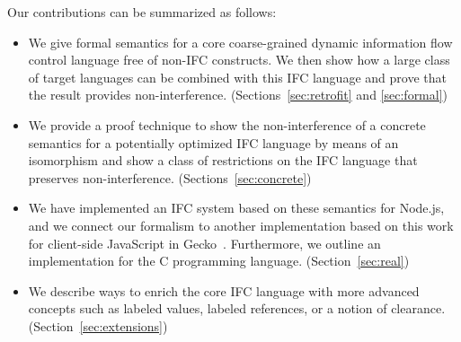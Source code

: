 Our contributions can be summarized as follows:
\begin{itemize}
  \item We give formal semantics for a core coarse-grained
  dynamic information flow control language free of non-IFC constructs.
  We then show how a large class of target languages can be combined
  with this IFC language and prove that the result provides
  non-interference. (Sections~\ref{sec:retrofit} and \ref{sec:formal})
  \item We provide a proof technique to show the non-interference
  of a concrete semantics for a potentially optimized IFC language
  by means of an isomorphism and show a class of restrictions on
  the IFC language that preserves non-interference. (Sections~\ref{sec:concrete})
  \item We have implemented an IFC system based on these semantics
  for Node.js, and we connect our formalism to another implementation
  based on this work
  for client-side JavaScript in Gecko~\cite{swapi}.
  Furthermore, we outline an implementation for the C programming
  language.
  (Section~\ref{sec:real})
  \item We describe ways to enrich the core IFC language with
  more advanced concepts such as labeled values, labeled references, or a
  notion of clearance. (Section~\ref{sec:extensions})
\end{itemize}

